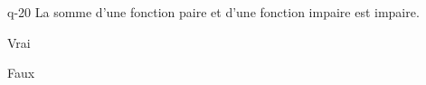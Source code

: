 \begin{truefalse}{q-20}
La somme d'une fonction paire et d'une fonction impaire est impaire.
\item Vrai
\item* Faux
\end{truefalse}

